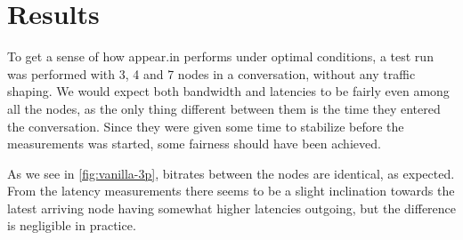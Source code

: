 \section{Results}

To get a sense of how appear.in performs under optimal conditions, a test run was performed with 3, 4 and 7 nodes in a conversation, without any traffic shaping. We would expect both bandwidth and latencies to be fairly even among all the nodes, as the only thing different between them is the time they entered the conversation. Since they were given some time to stabilize before the measurements was started, some fairness should have been achieved.

As we see in \autoref{fig:vanilla-3p}, bitrates between the nodes are identical, as expected. From the latency measurements there seems to be a slight inclination towards the latest arriving node having somewhat higher latencies outgoing, but the difference is negligible in practice.

